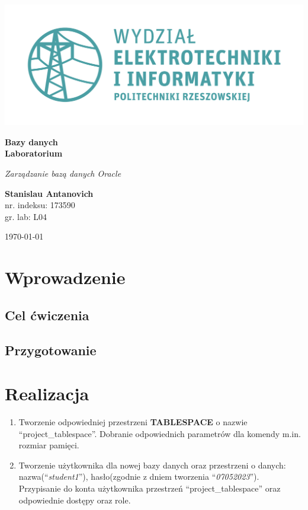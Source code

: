 \documentclass{article}
\begin{document}
\begin{titlepage}
\begin{center}
	\includegraphics[scale=0.7]{logo.png}

	\vspace*{4cm}
	\textbf{Bazy danych\\ Laboratorium}

	\vspace{1.5cm}
	\textit{Zarządzanie bazą danych Oracle}

	\vspace{1.5cm}
	\textbf{Stanislau Antanovich}\\
	nr. indeksu: 173590\\
	gr. lab: L04

	\vspace{4.5cm}
	\today
\end{center}
\end{titlepage}

\section{Wprowadzenie}
\subsection{Cel ćwiczenia}
\subsection{Przygotowanie}

\section{Realizacja}

\begin{enumerate}
\item Tworzenie odpowiedniej przestrzeni \textbf{TABLESPACE} o nazwie ``project\_tablespace''. Dobranie odpowiednich parametrów dla komendy m.in. rozmiar pamięci.

\item Tworzenie użytkownika dla nowej bazy danych oraz przestrzeni o danych: nazwa(``\emph{student1}''), hasło(zgodnie z dniem tworzenia ``\emph{07052023}''). Przypisanie do konta użytkownika przestrzeń ``project\_tablespace'' oraz odpowiednie dostępy oraz role.
\end{enumerate}
\end{document}
